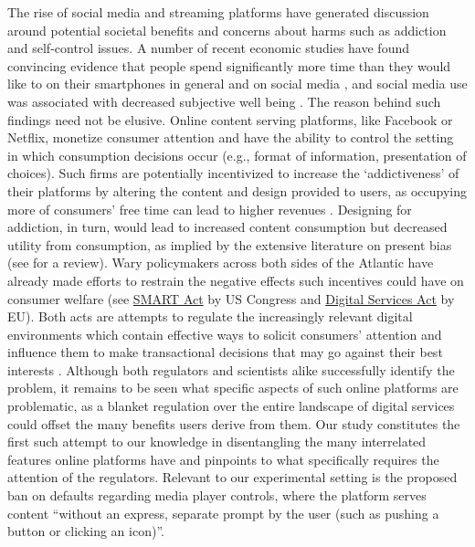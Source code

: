 \documentclass[11pt,a4paper,oneside]{article}
\begin{document}
The rise of social media and streaming platforms have generated discussion around potential societal benefits and concerns about harms such as addiction and self-control issues. A number of recent economic studies have found convincing evidence that people spend significantly more time than they would like to on their smartphones in general \citep{hoong2021self} and on social media \citep{allcott2022digital}, and social media use was associated with decreased subjective well being \citep{allcott2020welfare}. The reason behind such findings need not be elusive. Online content serving platforms, like Facebook or Netflix, monetize consumer attention and have the ability to control the setting in which consumption decisions occur (e.g., format of information, presentation of choices). Such firms are potentially incentivized to increase the `addictiveness' of their platforms by altering the content and design provided to users, as occupying more of consumers' free time can lead to higher revenues \citep{ichihashi2023addictive, kleinberg2022challenge}. Designing for addiction, in turn, would lead to increased content consumption but decreased utility from consumption, as implied by the extensive literature on present bias (see \citet{ericson2019intertemporal} for a review). Wary policymakers across both sides of the Atlantic have already made efforts to restrain the negative effects such incentives could have on consumer welfare (see \hyperlink{https://www.congress.gov/bill/116th-congress/senate-bill/2314/text}{SMART Act} by US Congress and \hyperlink{https://digital-strategy.ec.europa.eu/en/policies/digital-services-act-package}{Digital Services Act} by EU). Both acts are attempts to regulate the increasingly relevant digital environments which contain effective ways to solicit consumers' attention and influence them to make transactional decisions that may go against their best interests \citep{lupianez2022behavioural}. Although both regulators and scientists alike successfully identify the problem, it remains to be seen what specific aspects of such online platforms are problematic, as a blanket regulation over the entire landscape of digital services could offset the many benefits users derive from them. Our study constitutes the first such attempt to our knowledge in disentangling the many interrelated features online platforms have and pinpoints to what specifically requires the attention of the regulators. Relevant to our experimental setting is the proposed ban on defaults regarding media player controls, where the platform serves content ``without an express, separate prompt by the user (such as pushing a button or clicking an icon)''. 
\end{document}
